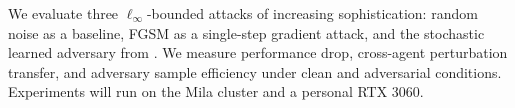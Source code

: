 \documentclass{article}
\begin{document}
We evaluate three $\ell_\infty$-bounded attacks of increasing sophistication: random noise as a baseline, FGSM \citep{goodfellow2014explaining} as a single-step gradient attack, and the stochastic learned adversary from \citet{zhou2025robust}. We measure performance drop, cross-agent perturbation transfer, and adversary sample efficiency under clean and adversarial conditions. Experiments will run on the Mila cluster and a personal RTX 3060.




\end{document}
